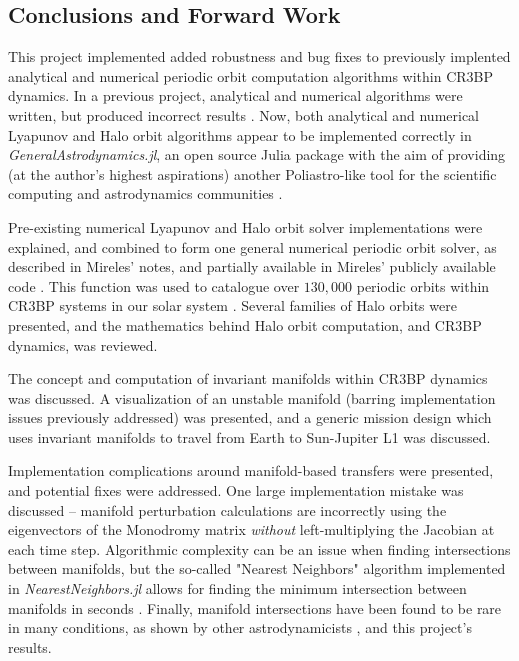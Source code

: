 \documentclass[conf]{new-aiaa}
\begin{document}
\begin{multicols*}{2}
\section{Conclusions and Forward Work}
This project implemented added robustness and bug fixes to previously 
implented analytical and numerical periodic orbit computation algorithms
within CR3BP dynamics. In a previous project, analytical and numerical 
algorithms were written, but produced incorrect results \cite{carpinelli2020halos}.
Now, both analytical and numerical Lyapunov and Halo orbit algorithms appear 
to be implemented correctly in \textit{GeneralAstrodynamics.jl}, an 
open source Julia package with the aim of providing (at the author's 
highest aspirations) another Poliastro-like tool for the scientific computing
and astrodynamics communities \cite{carpinelli2020astro}.

Pre-existing numerical Lyapunov and Halo orbit solver implementations
were explained, and 
combined to form one general numerical periodic orbit solver,
as described in Mireles' notes, and partially available in 
Mireles' publicly available code \cite{mirelesNotes} \cite{mirelesCode}.
This function was used to catalogue over $130,000$ periodic orbits within 
CR3BP systems in our solar system \cite{carpinelli2020halos}.
Several families of Halo orbits were presented, and the mathematics
behind Halo orbit computation, and CR3BP dynamics, was reviewed.

The concept and computation of invariant manifolds within CR3BP
dynamics was discussed. A visualization of an unstable manifold 
(barring implementation issues previously addressed) was presented,
and a generic mission design which uses invariant manifolds 
to travel from Earth to Sun-Jupiter L1 was discussed. 

Implementation complications around manifold-based transfers were 
presented, and potential fixes were addressed. One large implementation mistake 
was discussed -- manifold perturbation calculations are incorrectly 
using the eigenvectors of the Monodromy matrix \textit{without} 
left-multiplying the Jacobian at each time step. Algorithmic complexity
can be an issue when finding intersections between manifolds, but the 
so-called "Nearest Neighbors" algorithm implemented in 
\textit{NearestNeighbors.jl} allows for finding the minimum intersection between
manifolds in seconds \cite{nearestNeighbors}. Finally, manifold intersections 
have been found to be rare in many conditions, as shown by other astrodynamicists
\cite{topputo2005low}, and this project's results.


\end{multicols*}
\end{document}
